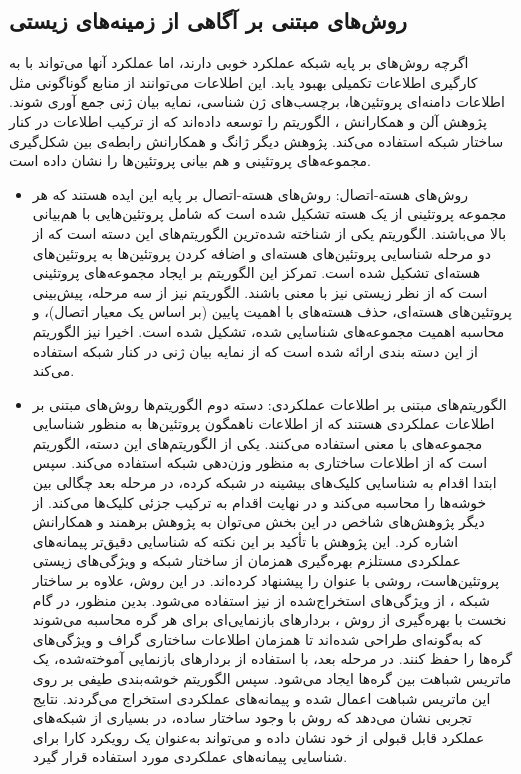 \subsection{روش‌های مبتنی بر آگاهی از زمینه‌های زیستی}
اگرچه روش‌های بر پایه شبکه عملکرد خوبی دارند، اما عملکرد آنها می‌تواند با به کارگیری اطلاعات تکمیلی بهبود یابد. این اطلاعات می‌توانند از منابع گوناگونی مثل اطلاعات دامنه‌ای پروتئین‌ها، برچسب‌های ژن شناسی، نمایه بیان ژنی جمع آوری شوند. پژوهش آلن و همکارانش \cite{2013PCIA}، الگوریتم  را توسعه داده‌اند که از ترکیب اطلاعات  در کنار ساختار شبکه استفاده می‌کند.  پژوهش دیگر ژانگ و همکارانش \cite{2019integrating} رابطه‌ی بین شکل‌گیری مجموعه‌های پروتئینی و هم بیانی پروتئین‌ها را نشان داده است.
\begin{itemize}
    \item روش‌های هسته-اتصال: روش‌های هسته-اتصال بر پایه این ایده هستند که هر مجموعه پروتئینی از یک هسته تشکیل شده‌ است که شامل پروتئین‌هایی با هم‌بیانی بالا می‌باشند. الگوریتم  \cite{2009core} یکی از شناخته شده‌ترین الگوریتم‌های این دسته است که از دو مرحله شناسایی پروتئین‌های هسته‌ای و اضافه کردن پروتئین‌ها به پروتئین‌های هسته‌ای تشکیل شده است. تمرکز این الگوریتم بر ایجاد مجموعه‌های پروتئینی است که از نظر زیستی نیز با معنی باشند. الگوریتم  \cite{2009predicting} نیز از سه مرحله‌، پیش‌بینی پروتئین‌های هسته‌ای، حذف هسته‌های با اهمیت پایین (بر اساس یک معیار اتصال)، و محاسبه اهمیت مجموعه‌های شناسایی شده، تشکیل شده است. اخیرا نیز الگوریتم  از این دسته ‌بندی ارائه شده است که از نمایه بیان ژنی در کنار شبکه  استفاده می‌کند.
    \item الگوریتم‌های مبتنی بر اطلاعات عملکردی: دسته دوم الگوریتم‌ها روش‌های مبتنی بر اطلاعات عملکردی هستند که از اطلاعات ناهمگون پروتئین‌ها به منظور شناسایی مجموعه‌های با معنی استفاده می‌کنند. یکی از الگوریتم‌های این دسته، الگوریتم  \cite{2008PCP} است که از اطلاعات ساختاری به منظور وزن‌دهی شبکه  استفاده می‌کند. سپس ابتدا اقدام به شناسایی کلیک‌های بیشینه  در شبکه  کرده، در مرحله بعد چگالی بین خوشه‌ها را محاسبه می‌کند و در نهایت اقدام به ترکیب جزئی کلیک‌ها می‌کند. از دیگر پژوهش‌‌های شاخص در این بخش می‌توان به پژوهش برهمند و همکارانش\cite{berahmand2021spectral} اشاره کرد. این پژوهش با تأکید بر این نکته که شناسایی دقیق‌تر پیمانه‌های عملکردی مستلزم بهره‌گیری همزمان از ساختار شبکه و ویژگی‌های زیستی پروتئین‌هاست، روشی با عنوان  را پیشنهاد کرده‌اند. در این روش، علاوه بر ساختار شبکه ، از ویژگی‌های استخراج‌شده از  نیز استفاده می‌شود. بدین منظور، در گام نخست با بهره‌گیری از روش \cite{yang2015network}
    ، بردارهای بازنمایی‌ای برای هر گره محاسبه می‌شوند که به‌گونه‌ای طراحی شده‌اند تا همزمان اطلاعات ساختاری گراف و ویژگی‌های گره‌ها را حفظ کنند. در مرحله بعد، با استفاده از بردارهای بازنمایی آموخته‌شده، یک ماتریس شباهت بین گره‌ها ایجاد می‌شود. سپس الگوریتم خوشه‌بندی طیفی بر روی این ماتریس شباهت اعمال شده و پیمانه‌های عملکردی استخراج می‌گردند. نتایج تجربی نشان می‌دهد که روش  با وجود ساختار ساده، در بسیاری از شبکه‌های  عملکرد قابل قبولی از خود نشان داده و می‌تواند به‌عنوان یک رویکرد کارا برای شناسایی پیمانه‌های عملکردی مورد استفاده قرار گیرد.
   

\end{itemize}
